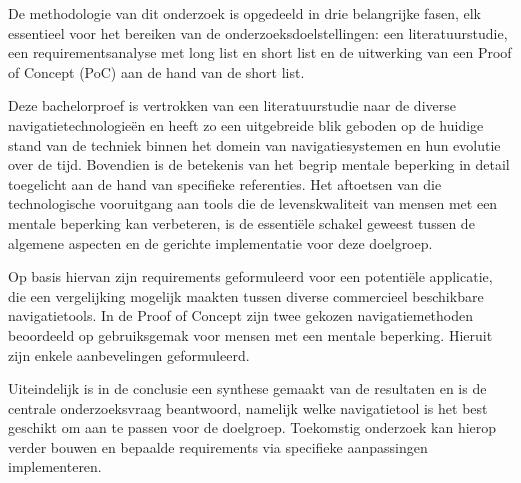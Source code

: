 De methodologie van dit onderzoek is opgedeeld in drie belangrijke fasen, elk essentieel voor het bereiken van de onderzoeksdoelstellingen: een literatuurstudie, een requirementsanalyse met long list en short list en de uitwerking van een Proof of Concept (PoC) aan de hand van de short list.

Deze bachelorproef is vertrokken van een literatuurstudie naar de diverse navigatietechnologieën en heeft zo een uitgebreide blik geboden op de huidige stand van de techniek binnen het domein van navigatiesystemen en hun evolutie over de tijd. Bovendien is de betekenis van het begrip mentale beperking in detail toegelicht aan de hand van specifieke referenties. Het aftoetsen van die technologische vooruitgang aan tools die de levenskwaliteit van mensen met een mentale beperking kan verbeteren, is de essentiële schakel geweest tussen de algemene aspecten en de gerichte implementatie voor deze doelgroep.

Op basis hiervan zijn requirements geformuleerd voor een potentiële applicatie, die een vergelijking mogelijk maakten tussen diverse commercieel beschikbare navigatietools. In de Proof of Concept zijn twee gekozen navigatiemethoden beoordeeld op gebruiksgemak voor mensen met een mentale beperking. Hieruit zijn enkele aanbevelingen geformuleerd. 

Uiteindelijk is in de conclusie een synthese gemaakt van de resultaten en is de centrale onderzoeksvraag beantwoord, namelijk welke navigatietool is het best geschikt om aan te passen voor de doelgroep. Toekomstig onderzoek kan hierop verder bouwen en bepaalde requirements via specifieke aanpassingen implementeren.